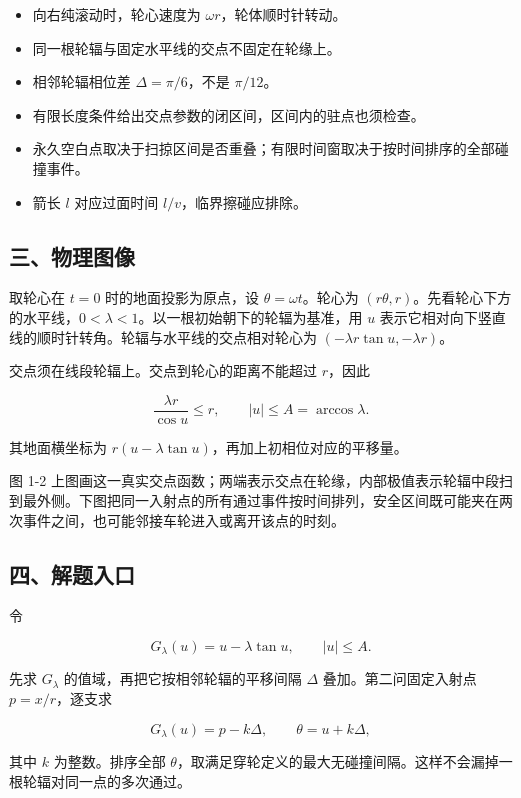 \documentclass[12pt,a4paper,UTF8]{ctexart}
\newcommand{\tightlist}{\setlength{\itemsep}{0pt}\setlength{\parskip}{0pt}}
\begin{document}
\begin{itemize}
\tightlist
\item
  向右纯滚动时，轮心速度为 \(\omega r\)，轮体顺时针转动。
\item
  同一根轮辐与固定水平线的交点不固定在轮缘上。
\item
  相邻轮辐相位差 \(\Delta=\pi/6\)，不是 \(\pi/12\)。
\item
  有限长度条件给出交点参数的闭区间，区间内的驻点也须检查。
\item
  永久空白点取决于扫掠区间是否重叠；有限时间窗取决于按时间排序的全部碰撞事件。
\item
  箭长 \(l\) 对应过面时间 \(l/v\)，临界擦碰应排除。
\end{itemize}

\subsection{三、物理图像}\label{ux4e09ux7269ux7406ux56feux50cf}

取轮心在 \(t=0\) 时的地面投影为原点，设 \(\theta=\omega t\)。轮心为
\((r\theta,r)\)。先看轮心下方的水平线，\(0<\lambda<1\)。以一根初始朝下的轮辐为基准，用
\(u\) 表示它相对向下竖直线的顺时针转角。轮辐与水平线的交点相对轮心为
\((-\lambda r\tan u,-\lambda r)\)。

交点须在线段轮辐上。交点到轮心的距离不能超过 \(r\)，因此

\[\frac{\lambda r}{\cos u}\le r,\qquad |u|\le A=\arccos\lambda.\]

其地面横坐标为 \(r(u-\lambda\tan u)\)，再加上初相位对应的平移量。

图 1-2
上图画这一真实交点函数；两端表示交点在轮缘，内部极值表示轮辐中段扫到最外侧。下图把同一入射点的所有通过事件按时间排列，安全区间既可能夹在两次事件之间，也可能邻接车轮进入或离开该点的时刻。

\subsection{四、解题入口}\label{ux56dbux89e3ux9898ux5165ux53e3}

令

\[G_\lambda(u)=u-\lambda\tan u,\qquad |u|\le A.\]

先求 \(G_\lambda\) 的值域，再把它按相邻轮辐的平移间隔 \(\Delta\)
叠加。第二问固定入射点 \(p=x/r\)，逐支求

\[G_\lambda(u)=p-k\Delta,\qquad \theta=u+k\Delta,\]

其中 \(k\) 为整数。排序全部
\(\theta\)，取满足穿轮定义的最大无碰撞间隔。这样不会漏掉一根轮辐对同一点的多次通过。
\end{document}

